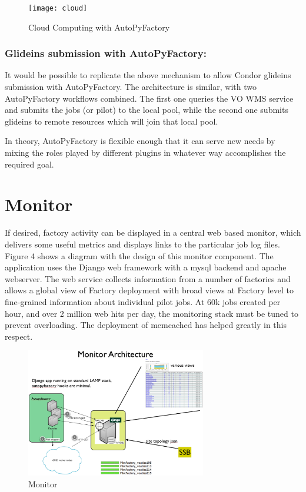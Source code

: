 \documentclass[a4paper]{jpconf}
\begin{document}
\begin{figure}[h]
\centering\texttt{[image: cloud]}
\caption{Cloud Computing with AutoPyFactory}
\label{cloud}
\end{figure}

\subsubsection{Glideins submission with AutoPyFactory:}
It would be possible to replicate the above mechanism to allow Condor glideins submission with AutoPyFactory.
The architecture is similar, with two AutoPyFactory workflows combined.
The first one queries the VO WMS service and submits the jobs (or pilot) to the local pool, 
while the second one submits glideins to remote resources which will join that local pool. 

In theory, AutoPyFactory is flexible enough that it can serve new needs by mixing the
roles played by different plugins in whatever way accomplishes the required goal. 

\section{Monitor}

If desired, factory activity can be displayed in a central web based monitor,
which delivers some useful metrics and displays links to the particular job log
files. Figure 4 shows a diagram with the design of this monitor component.
The application uses the Django web framework with a mysql backend and apache webserver. 
The web service collects information from a number of
factories and allows a global view of Factory deployment with broad
views at Factory level to fine-grained information about individual pilot jobs. 
At 60k jobs created per hour, and over 2 million web hits per day, 
the monitoring stack must be tuned to prevent overloading.
The deployment of memcached has helped greatly in this respect.


\begin{figure}[h]
\centering\includegraphics[width=0.7\textwidth]{monitor}
\caption{Monitor}
\label{monitor}
\end{figure}
\end{document}
